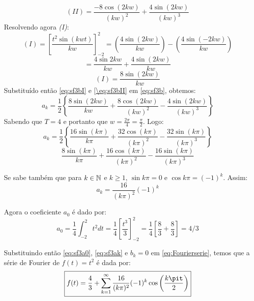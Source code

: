 \begin{equation}
    \label{\eq:sf3bII}
    \boxed{(II) = \frac{-8\cos{(2kw)}}{(kw)^2} + \frac{4\sin{(2kw)}}{(kw)^3}}
\end{equation}
Resolvendo agora \textit{(I)}:
\begin{equation*}
    (I) = \left[\frac{t^2\sin{(kwt)}}{kw}\right]_{-2}^2 = \left(\frac{4\sin{(2kw)}}{kw}\right) - \left(\frac{4\sin{(-2kw)}}{kw}\right)
\end{equation*}
\begin{equation*}
    = \frac{4\sin{2kw}}{kw} + \frac{4\sin{(2kw)}}{kw}
\end{equation*}
\begin{equation}
    \label{eq:sf3bI}
    (I) = \frac{8\sin{(2kw)}}{kw}
\end{equation}
Substituído então \ref{eq:sf3bI} e \ref{\eq:sf3bII} em \ref{eq:sf3b}, obtemos:
\begin{equation*}
    a_k = \frac{1}{2}\left\{\frac{8\sin{(2kw)}}{kw} + \frac{8\cos{(2kw)}}{(kw)^2} - \frac{4\sin{(2kw)}}{(kw)^3}\right\}
\end{equation*}
Sabendo que $T = 4$ e portanto que $w = \frac{2\pi}{4} = \frac{\pi}{2}$. Logo:
\begin{equation*}
    a_k = \frac{1}{2}\left\{\frac{16\sin{(k\pi)}}{k\pi} +  \frac{32\cos{(k\pi)}}{(k\pi)^2} - \frac{32\sin{(k\pi)}}{(k\pi)^3}\right\}
\end{equation*}
\begin{equation*}
    \frac{8\sin{(k\pi)}}{k\pi} +  \frac{16\cos{(k\pi)}}{(k\pi)^2} - \frac{16\sin{(k\pi)}}{(k\pi)^3}
\end{equation*}

Se sabe também que para $k\in\mathbb{N}$ e $k\geq1$, $\sin{k\pi} = 0$ e $\cos{k\pi} = (-1)^k$. Assim:
\begin{equation}
    \label{eq:sf3ak}
    a_k = \frac{16}{(k\pi)^2}(-1)^k
\end{equation}

Agora o coeficiente $a_0$ é dado por:
\begin{equation}
    \label{eq:sf3a0}
    a_0 = \frac{1}{4}\int_{-2}^2 t^2dt = \frac{1}{4}\left[\frac{t^3}{3}\right]_{-2}^2 = \frac{1}{4}\left[\frac{8}{3} + \frac{8}{3}\right] = 4/3
\end{equation}

Substituindo então \ref{eq:sf3a0}, \ref{eq:sf3ak} e $b_k = 0$ em \ref{eq:Fourierserie}, temos que a série de Fourier de $f(t) = t^2$ é dada por:
\begin{equation*}
    \boxed{f(t) = \frac{4}{3} + \sum_{k=1}^\infty \frac{16}{(k\pi)^2}(-1)^k\cos{\left(\frac{k\pit}{2}\right)}}
\end{equation*}